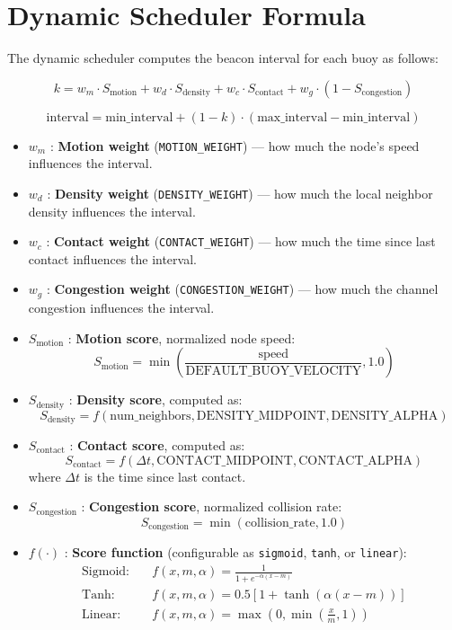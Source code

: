 \documentclass{article}
\begin{document}
\section*{Dynamic Scheduler Formula}

The dynamic scheduler computes the beacon interval for each buoy as follows:

\[
k = w_m \cdot S_{\text{motion}} + w_d \cdot S_{\text{density}} + w_c \cdot S_{\text{contact}} + w_g \cdot (1 - S_{\text{congestion}})
\]

\[
\text{interval} = \text{min\_interval} + (1 - k) \cdot (\text{max\_interval} - \text{min\_interval})
\]

\begin{itemize}
    \item $w_m$ : \textbf{Motion weight} (\texttt{MOTION\_WEIGHT}) --- how much the node's speed influences the interval.
    \item $w_d$ : \textbf{Density weight} (\texttt{DENSITY\_WEIGHT}) --- how much the local neighbor density influences the interval.
    \item $w_c$ : \textbf{Contact weight} (\texttt{CONTACT\_WEIGHT}) --- how much the time since last contact influences the interval.
    \item $w_g$ : \textbf{Congestion weight} (\texttt{CONGESTION\_WEIGHT}) --- how much the channel congestion influences the interval.
    \item $S_{\text{motion}}$ : \textbf{Motion score}, normalized node speed: 
    \[
    S_{\text{motion}} = \min\left(\frac{\text{speed}}{\text{DEFAULT\_BUOY\_VELOCITY}}, 1.0\right)
    \]
    \item $S_{\text{density}}$ : \textbf{Density score}, computed as:
    \[
    S_{\text{density}} = f(\text{num\_neighbors}, \text{DENSITY\_MIDPOINT}, \text{DENSITY\_ALPHA})
    \]
    \item $S_{\text{contact}}$ : \textbf{Contact score}, computed as:
    \[
    S_{\text{contact}} = f(\Delta t, \text{CONTACT\_MIDPOINT}, \text{CONTACT\_ALPHA})
    \]
    where $\Delta t$ is the time since last contact.
    \item $S_{\text{congestion}}$ : \textbf{Congestion score}, normalized collision rate:
    \[
    S_{\text{congestion}} = \min(\text{collision\_rate}, 1.0)
    \]
    \item $f(\cdot)$ : \textbf{Score function} (configurable as \texttt{sigmoid}, \texttt{tanh}, or \texttt{linear}):
    \begin{align*}
        \text{Sigmoid:} \quad & f(x, m, \alpha) = \frac{1}{1 + e^{-\alpha(x - m)}} \\
        \text{Tanh:} \quad & f(x, m, \alpha) = 0.5 \left[1 + \tanh(\alpha(x - m))\right] \\
        \text{Linear:} \quad & f(x, m, \alpha) = \max\left(0, \min\left(\frac{x}{m}, 1\right)\right)
    \end{align*}
\end{itemize}
\end{document}
